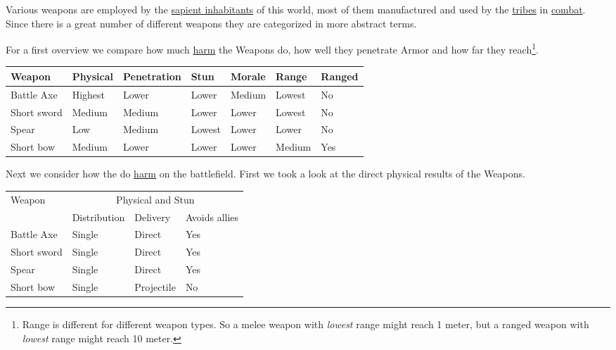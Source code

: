 Various weapons are employed by the
\hyperref[ch:World:Inhabitants:Sapients]{sapient inhabitants} of this world,
most of them manufactured and used by the \hyperref[ch:Tribes]{tribes} in
\hyperref[chch:Conflict:Combat]{combat}. Since there is a great number of
different weapons they are categorized in more abstract terms.

For a first overview we compare how much \hyperref[ch:Conflict:Combat]{harm}
the \glspl{Weapon} do, how well they penetrate \gls{Armor} and how far they
reach\footnote{ Range is different for different weapon types. So a melee
	weapon with \emph{lowest} range might reach 1 meter, but a ranged weapon with
	\emph{lowest} range might reach 10 meter. }.

\begin{longtable}{lllllll}
	\toprule
	Weapon
	 & Physical & Penetration
	 & Stun     & Morale
	 & Range    & Ranged      \\
	\midrule
	Battle Axe
	 & Highest  & Lower
	 & Lower    & Medium
	 & Lowest   & No          \\
	Short sword
	 & Medium   & Medium
	 & Lower    & Lower
	 & Lowest   & No          \\
	Spear
	 & Low      & Medium
	 & Lowest   & Lower
	 & Lower    & No          \\
	Short bow
	 & Medium   & Lower
	 & Lower    & Lower
	 & Medium   & Yes         \\
	\bottomrule
\end{longtable}

Next we consider how the do \hyperref[ch:Conflict:Combat]{harm} on the
battlefield. First we took a look at the direct physical results of the
\glspl{Weapon}.

\begin{longtable}{llll}
	\toprule
	Weapon
	 & \multicolumn{3}{c}{Physical and Stun}                              \\
	 & Distribution                          & Delivery   & Avoids allies \\
	\midrule
	Battle Axe
	 & Single                                & Direct     & Yes           \\
	Short sword
	 & Single                                & Direct     & Yes           \\
	Spear
	 & Single                                & Direct     & Yes           \\
	Short bow
	 & Single                                & Projectile & No            \\
	\bottomrule
\end{longtable}

